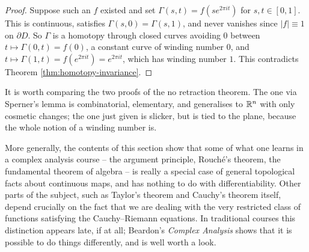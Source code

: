 \documentclass[a4paper]{scrartcl}
\begin{document}
\begin{proof}
	Suppose such an $f$ existed and set $\Gamma(s,t) = f(se^{2\pi it})$ for $s,t\in[0,1]$. This is continuous, satisfies $\Gamma(s,0)=\Gamma(s,1)$, and never vanishes since $|f|\equiv1$ on $\partial D$. So $\Gamma$ is a homotopy through closed curves avoiding $0$ between $t\mapsto\Gamma(0,t) = f(0)$, a constant curve of winding number $0$, and $t\mapsto\Gamma(1,t)=f(e^{2\pi it}) = e^{2\pi it}$, which has winding number $1$. This contradicts Theorem \ref{thm:homotopy-invariance}.
\end{proof}

It is worth comparing the two proofs of the no retraction theorem. The one via Sperner's lemma is combinatorial, elementary, and generalises to $\mathbb{R}^n$ with only cosmetic changes; the one just given is slicker, but is tied to the plane, because the whole notion of a winding number is.

More generally, the contents of this section show that some of what one learns in a complex analysis course -- the argument principle, Rouch\'e's theorem, the fundamental theorem of algebra -- is really a special case of general topological facts about continuous maps, and has nothing to do with differentiability. Other parts of the subject, such as Taylor's theorem and Cauchy's theorem itself, depend crucially on the fact that we are dealing with the very restricted class of functions satisfying the Cauchy--Riemann equations. In traditional courses this distinction appears late, if at all; Beardon's \emph{Complex Analysis} shows that it is possible to do things differently, and is well worth a look.
\end{document}
